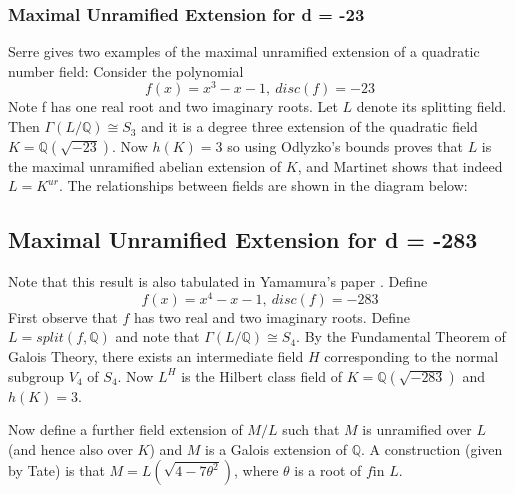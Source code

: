 \documentclass[12pt]{extarticle}
\newcommand{\Q}{\mathbb{Q}}
\newcommand{\<}{\langle}
\renewcommand{\>}{\rangle}
\theoremstyle{definition}
\begin{document}
\subsubsection*{Maximal Unramified Extension for d = -23}
Serre \cite{SERR} gives two examples of the maximal unramified extension of a quadratic number field:
Consider the polynomial \begin{equation}
 f(x)=x^3-x-1,\: disc(f)=-23
\end{equation}
Note f has one real root and two imaginary roots. Let $L$ denote its splitting field. Then $\Gamma(L/\Q)\cong S_3$ and it is a degree three extension of the quadratic field $K= \Q(\sqrt{-23})$. Now $h(K)=3$ so using Odlyzko's bounds proves that $L$ is the maximal unramified abelian extension of $K$, and Martinet shows that indeed $L = K^{ur}$. The relationships between fields are shown in the diagram below:
\begin{center}
\end{center}
\subsection{Maximal Unramified Extension for d = -283}
Note that this result is also tabulated in Yamamura's paper \cite{YAMA1997}. 
Define \begin{equation}
    f(x)=x^4-x-1, \: disc(f)=-283
\end{equation}
First observe that $f$ has two real and two imaginary roots. Define $L = split(f,\Q)$ and note that $\Gamma(L/\Q)\cong S_4$. By the Fundamental Theorem of Galois Theory, there exists an intermediate field $H$ corresponding to the normal subgroup $V_4$ of $S_4$. Now $L^H$ is the Hilbert class field of $K= \Q(\sqrt{-283})$ and $h(K)=3$. 
\par
Now define a further field extension of $M/L$ such that $M$ is unramified over $L$ (and hence also over $K$) and $M$ is a Galois extension of $\Q$. A construction (given by Tate) is that $M = L(\sqrt{4-7 \theta^2})$, where $\theta$ is a root of $f$in $L$. \par 
 
\end{document}
